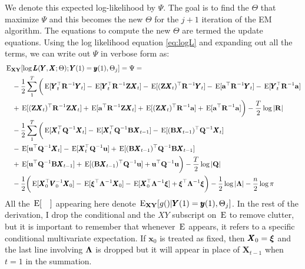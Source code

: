 \documentclass[]{article}
\def\xixi{\mbox{\boldmath $\xi$}}
\def\LAM{\mbox{\boldmath $\Lambda$}}
\def\ZZ{\mbox{$\mathbf Z$}}	\def\zz{\mbox{$\mathbf z$}}
\def\BB{\mbox{$\mathbf B$}}	\def\bb{\mbox{$\mathbf b$}}
\def\QQ{\mbox{$\mathbf Q$}}	 \def\qq{\mbox{$\mathbf q$}}
\def\RR{\mbox{$\mathbf R$}}	 \def\rr{\mbox{$\mathbf r$}}
\def\VV{\mbox{$\pmb{V}$}}	\def\vv{\mbox{$\pmb{v}$}}
\def\XX{\mbox{$\pmb{X}$}}	\def\xx{\mbox{$\pmb{x}$}}
\def\YY{\mbox{$\pmb{Y}$}}	\def\yy{\mbox{$\pmb{y}$}}
\def\LL{\mbox{$\pmb{L}$}}	\def\ll{\mbox{$\pmb{l}$}}
\def\E{\,\textup{\textrm{E}}}
\def\EXy{\,\textup{\textrm{E}}_{\text{{\bf XY}}}}
\begin{document}
We denote this expected log-likelihood by $\Psi$. The goal is to find the $\Theta$ that maximize $\Psi$ and this becomes the new $\Theta$ for the  $j+1$ iteration of the EM algorithm.  The equations to compute the new $\Theta$ are termed the update equations.  Using the log likelihood equation \ref{eq:logL} and expanding out all the terms, we can write out $\Psi$  in verbose form as:
\begin{equation}\label{eq:expLL}
\begin{split}
&\EXy[\log\LL(\YY,\XX ; \Theta);\YY(1)=\yy(1),\Theta_j] = \Psi = \\
&\quad -\frac{1}{2}\sum_1^T\bigg( \E[\YY_t^\top \RR^{-1} \YY_t] - \E[\YY_t^\top \RR^{-1}\ZZ\XX_t] - \E[(\ZZ\XX_t)^\top\RR^{-1}\YY_t] - \E[\aa^\top\RR^{-1}\YY_t] - \E[\YY_t^\top\RR^{-1}\aa]\\
&\quad   + \E[(\ZZ\XX_t)^\top\RR^{-1}\ZZ\XX_t] + \E[\aa^\top\RR^{-1}\ZZ\XX_t] + \E[(\ZZ\XX_t)^\top\RR^{-1}\aa] + \E[\aa^\top\RR^{-1}\aa]\bigg) 
 - \frac{T}{2}\log|\RR|\\
&\quad - \frac{1}{2}\sum_1^T\bigg(\E[\XX_t^\top\QQ^{-1}\XX_t] - \E[\XX_t^\top\QQ^{-1}\BB\XX_{t-1}]  - \E[(\BB\XX_{t-1})^\top\QQ^{-1}\XX_t]\\ 
&\quad - \E[\uu^\top\QQ^{-1}\XX_t] - \E[\XX_t^\top\QQ^{-1}\uu] + \E[(\BB\XX_{t-1})^\top\QQ^{-1}\BB\XX_{t-1}]\\
&\quad  + \E[\uu^\top\QQ^{-1}\BB\XX_{t-1}] + \E[(\BB\XX_{t-1})^\top\QQ^{-1}\uu] + \uu^\top\QQ^{-1}\uu\bigg) - \frac{T}{2}\log|\QQ| \\
&\quad - \frac{1}{2}\bigg(\E[\XX_0^\top\VV_0^{-1}\XX_0] - \E[\xixi^\top\LAM^{-1}\XX_0] - \E[\XX_0^\top\LAM^{-1}\xixi] + \xixi^\top\LAM^{-1}\xixi\bigg) - \frac{1}{2}\log|\LAM|
-\frac{n}{2}\log\pi
\end{split}
\end{equation}
All the $\E[\quad]$ appearing here denote $\EXy[g()|\YY(1)=\yy(1),\Theta_j]$.  In the rest of the derivation, I drop the conditional and the $XY$ subscript on $\E$ to remove clutter, but it is important to remember that whenever $\E$ appears, it refers to a specific conditional multivariate expectation.  If $\xx_0$ is treated as fixed, then $\XX_0=\xixi$ and the last line involving $\LAM$ is dropped but it will appear in place of $\XX_{t-1}$ when $t=1$ in the summation.
\end{document}
